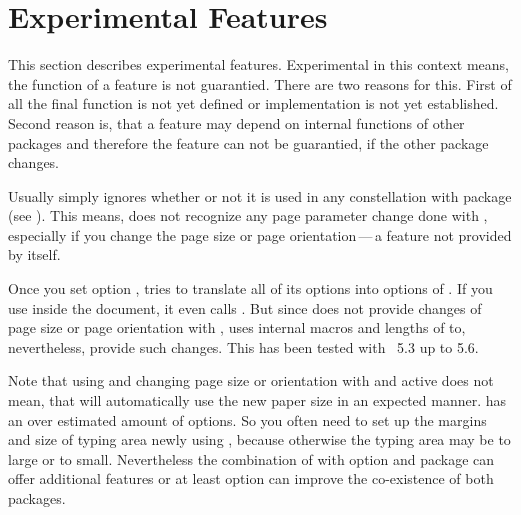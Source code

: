 \section{Experimental Features}

This section describes experimental features. Experimental in this context
means, the function of a feature is not guarantied. There are two reasons for
this. First of all the final function is not yet defined or implementation is
not yet established. Second reason is, that a feature may depend on internal
functions of other packages and therefore the feature can not be guarantied,
if the other package changes.

\begin{Declaration}
\end{Declaration}
Usually  simply ignores whether or not it is used in any
constellation with package  (see
\cite{package:geometry}). This means,  does not recognize
any page parameter change done with , especially if you
change the page size or page orientation\,---\,a feature not provided by
 itself.

Once you set option ,
 tries to translate all of its options into options of
. If you use  inside the document, it even
calls . But since  does not provide
changes of page size or page orientation with ,
 uses internal macros and lengths of  to,
nevertheless, provide such changes. This has been tested with
~5.3 up to 5.6.

Note that using  and changing page size or orientation with
 and active  does not mean, that
 will automatically use the new paper size in an expected
manner.  has an over estimated amount of options. So you
often need to set up the margins and size of typing area newly using
, because otherwise the typing area may be to large or to
small. Nevertheless the combination of  with option
 and package  can offer additional
features or at least option  can improve the co-existence
of both packages.%
\EndIndexGroup


